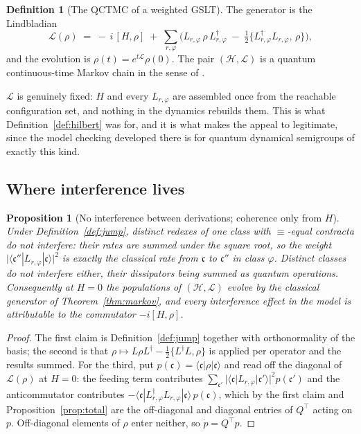 \documentclass[11pt,a4paper]{article}
\theoremstyle{plain}
\newtheorem{proposition}[theorem]{Proposition}
\theoremstyle{definition}
\newtheorem{definition}[theorem]{Definition}
\theoremstyle{remark}
\newcommand{\Lop}{L}
\begin{document}
\begin{definition}[The QCTMC of a weighted GSLT]
\label{def:qctmc}
The generator is the Lindbladian
\[
\mathcal{L}(\rho) \;=\; -\,i\,[H, \rho] \;+\; \sum_{r,\varphi}\Big( \Lop_{r,\varphi}\,\rho\,\Lop^\dagger_{r,\varphi} \;-\; \tfrac{1}{2}\big\{\Lop^\dagger_{r,\varphi}\Lop_{r,\varphi},\, \rho\big\}\Big),
\]
and the evolution is $\rho(t) = e^{t\mathcal{L}}\rho(0)$. The pair $(\mathcal{H}, \mathcal{L})$ is a
quantum continuous-time Markov chain in the sense of \cite{qctmc}.
\end{definition}

$\mathcal{L}$ is genuinely fixed: $H$ and every $\Lop_{r,\varphi}$ are assembled once from the
reachable configuration set, and nothing in the dynamics rebuilds them. This is what
Definition~\ref{def:hilbert} was for, and it is what makes the appeal to \cite{qctmc} legitimate,
since the model checking developed there is for quantum dynamical semigroups of exactly this kind.

\subsection{Where interference lives}
\label{sec:interference}

\begin{proposition}[No interference between derivations; coherence only from $H$]
\label{prop:interference}
Under Definition~\ref{def:jump}, distinct redexes of one class with $\equiv$-equal contracta do not
interfere: their rates are summed under the square root, so the weight
$\big|\langle\mathfrak{c}''|\Lop_{r,\varphi}|\mathfrak{c}\rangle\big|^2$ is exactly the classical
rate from $\mathfrak{c}$ to $\mathfrak{c}''$ in class $\varphi$. Distinct classes do not interfere
either, their dissipators being summed as quantum operations. Consequently at $H = 0$ the populations
of $(\mathcal{H},\mathcal{L})$ evolve by the classical generator of Theorem~\ref{thm:markov}, and
every interference effect in the model is attributable to the commutator $-i[H,\rho]$.
\end{proposition}

\begin{proof}
The first claim is Definition~\ref{def:jump} together with orthonormality of the basis; the second is
that $\rho \mapsto \Lop\rho\Lop^\dagger - \tfrac12\{\Lop^\dagger\Lop,\rho\}$ is applied per operator
and the results summed. For the third, put $p(\mathfrak{c}) = \langle\mathfrak{c}|\rho|\mathfrak{c}\rangle$
and read off the diagonal of $\mathcal{L}(\rho)$ at $H = 0$: the feeding term contributes
$\sum_{\mathfrak{c}'} |\langle\mathfrak{c}|\Lop_{r,\varphi}|\mathfrak{c}'\rangle|^2 p(\mathfrak{c}')$
and the anticommutator contributes
$-\langle\mathfrak{c}|\Lop^\dagger_{r,\varphi}\Lop_{r,\varphi}|\mathfrak{c}\rangle\, p(\mathfrak{c})$,
which by the first claim and Proposition~\ref{prop:total} are the off-diagonal and diagonal entries of
$Q^{\!\top}$ acting on $p$. Off-diagonal elements of $\rho$ enter neither, so $\dot p = Q^{\!\top}p$.
\end{proof}
\end{document}
